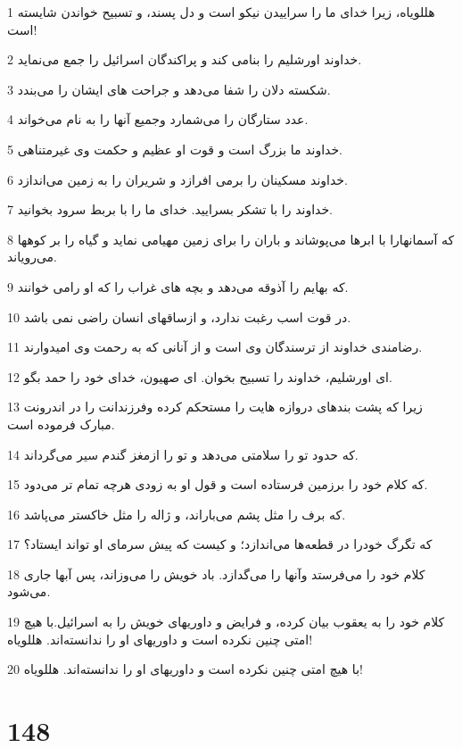 \par 1 هللویاه، زیرا خدای ما را سراییدن نیکو است و دل پسند، و تسبیح خواندن شایسته است!
\par 2 خداوند اورشلیم را بنامی کند و پراکندگان اسرائیل را جمع می‌نماید.
\par 3 شکسته دلان را شفا می‌دهد و جراحت های ایشان را می‌بندد.
\par 4 عدد ستارگان را می‌شمارد وجمیع آنها را به نام می‌خواند.
\par 5 خداوند ما بزرگ است و قوت او عظیم و حکمت وی غیرمتناهی.
\par 6 خداوند مسکینان را برمی افرازد و شریران را به زمین می‌اندازد.
\par 7 خداوند را با تشکر بسرایید. خدای ما را با بربط سرود بخوانید.
\par 8 که آسمانهارا با ابرها می‌پوشاند و باران را برای زمین مهیامی نماید و گیاه را بر کوهها می‌رویاند.
\par 9 که بهایم را آذوقه می‌دهد و بچه های غراب را که او رامی خوانند.
\par 10 در قوت اسب رغبت ندارد، و ازساقهای انسان راضی نمی باشد.
\par 11 رضامندی خداوند از ترسندگان وی است و از آنانی که به رحمت وی امیدوارند.
\par 12 ‌ای اورشلیم، خداوند را تسبیح بخوان. ای صهیون، خدای خود را حمد بگو.
\par 13 زیرا که پشت بندهای دروازه هایت را مستحکم کرده وفرزندانت را در اندرونت مبارک فرموده است.
\par 14 که حدود تو را سلامتی می‌دهد و تو را ازمغز گندم سیر می‌گرداند.
\par 15 که کلام خود را برزمین فرستاده است و قول او به زودی هر‌چه تمام تر می‌دود.
\par 16 که برف را مثل پشم می‌باراند، و ژاله را مثل خاکستر می‌پاشد.
\par 17 که تگرگ خودرا در قطعه‌ها می‌اندازد؛ و کیست که پیش سرمای او تواند ایستاد؟
\par 18 کلام خود را می‌فرستد وآنها را می‌گدازد. باد خویش را می‌وزاند، پس آبها جاری می‌شود.
\par 19 کلام خود را به یعقوب بیان کرده، و فرایض و داوریهای خویش را به اسرائیل.با هیچ امتی چنین نکرده است و داوریهای او را ندانسته‌اند. هللویاه!
\par 20 با هیچ امتی چنین نکرده است و داوریهای او را ندانسته‌اند. هللویاه!
 
\chapter{148}

